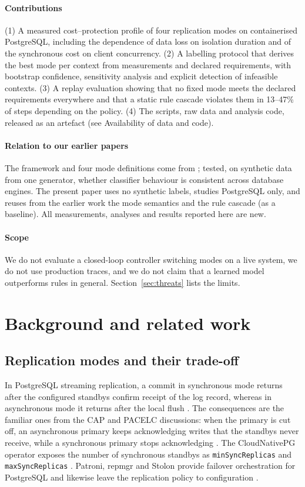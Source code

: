 \documentclass[preprint,12pt]{elsarticle}
\begin{document}
\paragraph{Contributions}
(1) A measured cost--protection profile of four replication modes on containerised PostgreSQL, including the dependence of data loss on isolation duration and of the synchronous cost on client concurrency. (2) A labelling protocol that derives the best mode per context from measurements and declared requirements, with bootstrap confidence, sensitivity analysis and explicit detection of infeasible contexts. (3) A replay evaluation showing that no fixed mode meets the declared requirements everywhere and that a static rule cascade violates them in 13--47\% of steps depending on the policy. (4) The scripts, raw data and analysis code, released as an artefact (see Availability of data and code).

\paragraph{Relation to our earlier papers}
The framework and four mode definitions come from \cite{jerrari2026iaha}; \cite{jerrari2026cross} tested, on synthetic data from one generator, whether classifier behaviour is consistent across database engines. The present paper uses no synthetic labels, studies PostgreSQL only, and reuses from the earlier work the mode semantics and the rule cascade (as a baseline). All measurements, analyses and results reported here are new.

\paragraph{Scope}
We do not evaluate a closed-loop controller switching modes on a live system, we do not use production traces, and we do not claim that a learned model outperforms rules in general. Section~\ref{sec:threats} lists the limits.

\section{Background and related work}\label{sec:related}
\subsection{Replication modes and their trade-off}
In PostgreSQL streaming replication, a commit in synchronous mode returns after the configured standbys confirm receipt of the log record, whereas in asynchronous mode it returns after the local flush \cite{pgdocs}. The consequences are the familiar ones from the CAP and PACELC discussions: when the primary is cut off, an asynchronous primary keeps acknowledging writes that the standbys never receive, while a synchronous primary stops acknowledging \cite{gilbert2002,abadi2012}. The CloudNativePG operator exposes the number of synchronous standbys as \texttt{minSyncReplicas} and \texttt{maxSyncReplicas} \cite{cnpg}. Patroni, repmgr and Stolon provide failover orchestration for PostgreSQL and likewise leave the replication policy to configuration \cite{patroni,repmgr,stolon}.
\end{document}

